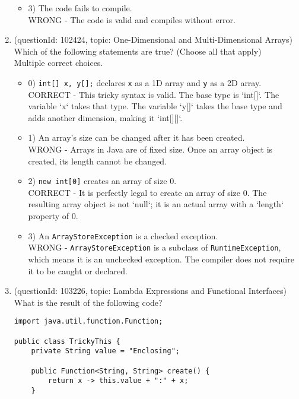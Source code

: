 \documentclass[12pt]{article}
\begin{document}
\begin{enumerate}[label=(\arabic*)]
\begin{itemize}
\item 3) The code fails to compile.
 \\ 
WRONG - The code is valid and compiles without error.

\end{itemize}
\item (questionId: 102424, topic: One-Dimensional and Multi-Dimensional Arrays) \\ 
Which of the following statements are true? (Choose all that apply)
\\ \noindent Multiple correct choices. 
\begin{itemize}
\item 0) \verb|int[] x, y[];| declares \verb|x| as a 1D array and \verb|y| as a 2D array.
 \\ 
CORRECT - This tricky syntax is valid. The base type is `int[]`. The variable `x` takes that type. The variable `y[]` takes the base type and adds another dimension, making it `int[][]`.

\item 1) An array's size can be changed after it has been created.
 \\ 
WRONG - Arrays in Java are of fixed size. Once an array object is created, its length cannot be changed.

\item 2) \verb|new int[0]| creates an array of size 0.
 \\ 
CORRECT - It is perfectly legal to create an array of size 0. The resulting array object is not `null`; it is an actual array with a `length` property of 0.

\item 3) An \verb|ArrayStoreException| is a checked exception.
 \\ 
WRONG - \verb|ArrayStoreException| is a subclass of \verb|RuntimeException|, which means it is an unchecked exception. The compiler does not require it to be caught or declared.

\end{itemize}
\item (questionId: 103226, topic: Lambda Expressions and Functional Interfaces) \\ 
What is the result of the following code?
\begin{verbatim}
import java.util.function.Function;

public class TrickyThis {
    private String value = "Enclosing";

    public Function<String, String> create() {
        return x -> this.value + ":" + x;
    }


\end{verbatim}
\end{enumerate}
\end{document}
